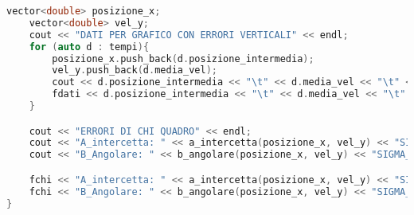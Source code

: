 \documentclass[a4paper,11pt,oneside]{article}
\begin{document}
\begin{lstlisting}[language=C++, label=lst:seconda_analisi.cxx, caption=seconda\_analisi.cxx]
    vector<double> posizione_x;
    vector<double> vel_y;
    cout << "DATI PER GRAFICO CON ERRORI VERTICALI" << endl;
    for (auto d : tempi){
        posizione_x.push_back(d.posizione_intermedia);
        vel_y.push_back(d.media_vel);
        cout << d.posizione_intermedia << "\t" << d.media_vel << "\t" << d.dstd_vel << endl;
        fdati << d.posizione_intermedia << "\t" << d.media_vel << "\t" << d.dstd_vel << endl;
    }

    cout << "ERRORI DI CHI QUADRO" << endl;
    cout << "A_intercetta: " << a_intercetta(posizione_x, vel_y) << "SIGMA_A: " << sigma_a(posizione_x, vel_y) << endl;
    cout << "B_Angolare: " << b_angolare(posizione_x, vel_y) << "SIGMA_B: " << sigma_b(posizione_x, vel_y) << endl;

    fchi << "A_intercetta: " << a_intercetta(posizione_x, vel_y) << "SIGMA_A: " << sigma_a(posizione_x, vel_y) << endl;
    fchi << "B_Angolare: " << b_angolare(posizione_x, vel_y) << "SIGMA_B: " << sigma_b(posizione_x, vel_y) << endl;
}
\end{lstlisting}
\end{document}
